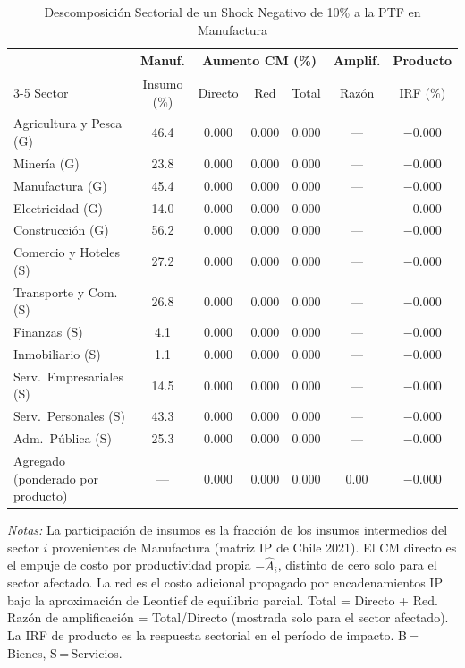 \begin{table}[htbp]
\centering
\caption{Descomposición Sectorial de un Shock Negativo de 10\% a la PTF en Manufactura}
\label{tab:mfg_decomp}
\begin{threeparttable}
\small
\begin{tabular}{@{}l c c c c c c@{}}
\toprule
 & Manuf. & \multicolumn{3}{c}{Aumento CM (\%)} & Amplif. & Producto \\
\cmidrule(lr){3-5}
Sector & Insumo (\%) & Directo & Red & Total & Razón & IRF (\%) \\
\midrule
Agricultura y Pesca (G) & 46.4 & 0.000 & 0.000 & 0.000 & --- & $-0.000$ \\
Minería (G) & 23.8 & 0.000 & 0.000 & 0.000 & --- & $-0.000$ \\
Manufactura (G) & 45.4 & 0.000 & 0.000 & 0.000 & --- & $-0.000$ \\
Electricidad (G) & 14.0 & 0.000 & 0.000 & 0.000 & --- & $-0.000$ \\
Construcción (G) & 56.2 & 0.000 & 0.000 & 0.000 & --- & $-0.000$ \\
Comercio y Hoteles (S) & 27.2 & 0.000 & 0.000 & 0.000 & --- & $-0.000$ \\
Transporte y Com. (S) & 26.8 & 0.000 & 0.000 & 0.000 & --- & $-0.000$ \\
Finanzas (S) &  4.1 & 0.000 & 0.000 & 0.000 & --- & $-0.000$ \\
Inmobiliario (S) &  1.1 & 0.000 & 0.000 & 0.000 & --- & $-0.000$ \\
Serv.\ Empresariales (S) & 14.5 & 0.000 & 0.000 & 0.000 & --- & $-0.000$ \\
Serv.\ Personales (S) & 43.3 & 0.000 & 0.000 & 0.000 & --- & $-0.000$ \\
Adm.\ Pública (S) & 25.3 & 0.000 & 0.000 & 0.000 & --- & $-0.000$ \\
\midrule
Agregado (ponderado por producto) & --- & 0.000 & 0.000 & 0.000 &  0.00 & $-0.000$ \\
\bottomrule
\end{tabular}
\begin{tablenotes}[flushleft]
\footnotesize
\item \textit{Notas:} La participación de insumos es la fracción de los insumos intermedios del sector $i$ provenientes de Manufactura (matriz IP de Chile 2021). El CM directo es el empuje de costo por productividad propia $-\hat A_i$, distinto de cero solo para el sector afectado. La red es el costo adicional propagado por encadenamientos IP bajo la aproximación de Leontief de equilibrio parcial. Total = Directo + Red. Razón de amplificación = Total/Directo (mostrada solo para el sector afectado). La IRF de producto es la respuesta sectorial en el período de impacto. B\,=\,Bienes, S\,=\,Servicios.
\end{tablenotes}
\end{threeparttable}
\end{table}
